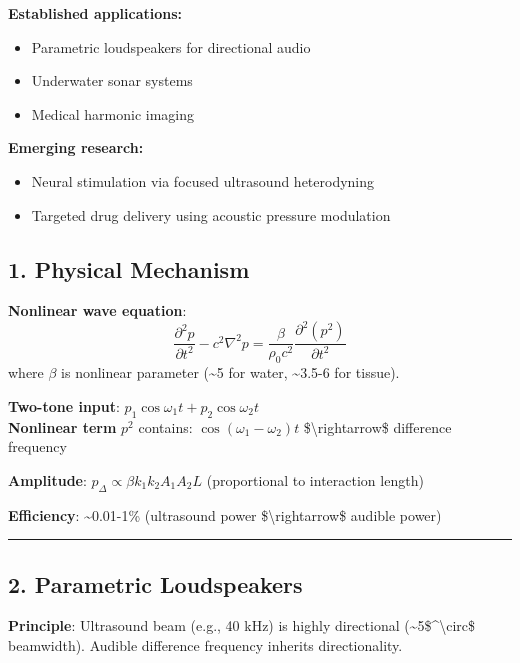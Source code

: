 \textbf{Established applications:}
\begin{itemize}
\item Parametric loudspeakers for directional audio
\item Underwater sonar systems
\item Medical harmonic imaging
\end{itemize}

\textbf{Emerging research:}
\begin{itemize}
\item Neural stimulation via focused ultrasound heterodyning
\item Targeted drug delivery using acoustic pressure modulation
\end{itemize}

\subsection{\texorpdfstring{1. Physical Mechanism
}{1. Physical Mechanism }}\label{physical-mechanism}

\textbf{Nonlinear wave equation}:
\[\frac{\partial^2 p}{\partial t^2} - c^2 \nabla^2 p = \frac{\beta}{\rho_0 c^2} \frac{\partial^2 (p^2)}{\partial t^2}\]
where \(\beta\) is nonlinear parameter (\textasciitilde5 for water,
\textasciitilde3.5-6 for tissue).

\textbf{Two-tone input}: \(p_1 \cos\omega_1 t + p_2 \cos\omega_2 t\)\\
\textbf{Nonlinear term} \(p^2\) contains: \(\cos(\omega_1 - \omega_2)t\)
\$\textbackslash rightarrow\$ difference frequency

\textbf{Amplitude}: \(p_\Delta \propto \beta k_1 k_2 A_1 A_2 L\)
(proportional to interaction length)

\textbf{Efficiency}: \textasciitilde0.01-1\% (ultrasound power
\$\textbackslash rightarrow\$ audible power)

\begin{center}\rule{0.5\linewidth}{0.5pt}\end{center}

\subsection{\texorpdfstring{2. Parametric Loudspeakers
}{2. Parametric Loudspeakers }}\label{parametric-loudspeakers}

\textbf{Principle}: Ultrasound beam (e.g., 40 kHz) is highly directional
(\textasciitilde5\$\^{}\textbackslash circ\$ beamwidth). Audible
difference frequency inherits directionality.

